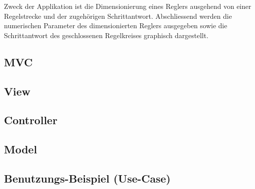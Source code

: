 
Zweck  der Applikation  ist die  Dimensionierung eines  Reglers ausgehend  von
einer Regelstrecke und  der zugeh\"origen Schrittantwort. Abschliessend werden
die  numerischen Parameter  des dimensionierten  Reglers ausgegeben  sowie die
Schrittantwort des geschlossenen Regelkreises graphisch dargestellt.


\subsection{MVC}
\label{subs:mvc}


\subsection{View}
\label{subs:view}



\subsection{Controller}



\subsection{Model}



\subsection{Benutzungs-Beispiel (Use-Case)}

